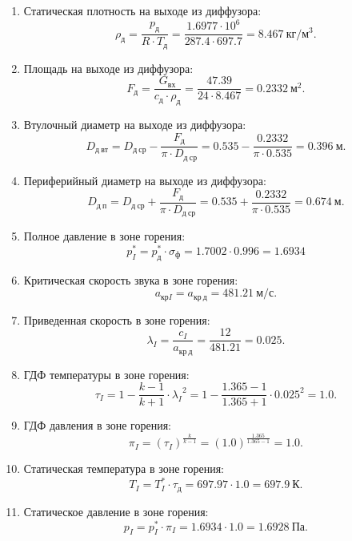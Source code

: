 \documentclass[a4paper,12pt]{article}
\begin{document}
\begin{enumerate}
    	\item Статическая плотность на выходе из диффузора:
    	\[
    		\rho_д = \frac{p_д}{R \cdot T_д} = 
    		\frac{1.6977 \cdot 10^6}{ 287.4 \cdot 697.7} =
    		8.467\ кг/м^3.
    	\]

    	\item Площадь на выходе из диффузора:
    	\[
    		F_д = \frac{G_{вх}}{ c_д \cdot \rho_д } = \frac{47.39
    				}{ 
    				24 \cdot 8.467 
    			} =
    		0.2332\ м^2. 
    	\]

    	\item Втулочный диаметр на выходе из диффузора:
    	\[
    		D_{д\ вт} = D_{д\ ср} - \frac{F_д}{\pi \cdot D_{д\ ср}} = 
    		0.535 - \frac{0.2332}{\pi \cdot 0.535} = 
    		0.396\ м.
    	\]

    	\item Периферийный диаметр на выходе из диффузора:
    	\[
    		D_{д\ п} = D_{д\ ср} + \frac{F_д}{\pi \cdot D_{д\ ср}} = 
    		0.535 + \frac{0.2332}{\pi \cdot 0.535} = 
    		0.674\ м.
    	\]

    	\item Полное давление в зоне горения:
    	\[
    		p_I^* = p_д^* \cdot \sigma_ф = 1.7002 \cdot 0.996 = 
    		1.6934
    	\]

    	\item Критическая скорость звука в зоне горения:
    	\[
    		a_{крI} = a_{кр\ д} =
    		481.21\ м/с.
    	\]

    	\item Приведенная скорость в зоне горения:
    	\[
    		\lambda_I = \frac{c_I}{a_{кр\ д}} = \frac{12}{481.21} = 
    		0.025.
    	\]

    	\item ГДФ температуры в зоне горения:
    	\[
    		\tau_I =  1 - \frac{k - 1}{k + 1} \cdot {\lambda_I}^2  =  
    		1 - \frac{1.365 - 1}{1.365 + 1} 
    		\cdot {0.025}^2  = 
    		1.0.
    	\]

    	\item ГДФ давления в зоне горения:
    	\[
    		\pi_I = \left( \tau_I  \right) ^ \frac{k}{k -1} = 
    		\left( 
    			1.0  
    			\right) ^ \frac{1.365}{1.365 -1} = 
    		1.0.
    	\]

    	\item Статическая температура в зоне горения:
    	\[
    		T_{I} = T_{I}^* \cdot \tau_д = 697.97 \cdot 1.0 = 697.9\ К.
    	\]

    	\item Статическое давление в зоне горения:
    	\[
    		p_{I} = p_I^* \cdot \pi_I = 1.6934 \cdot 1.0 = 
    		1.6928\ Па.
    	\]


\end{enumerate}
\end{document}
